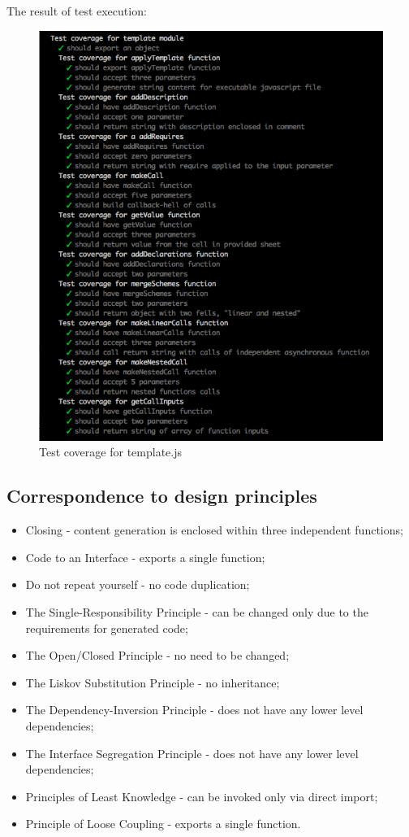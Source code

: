The result of test execution:
\begin{figure}[H]
	\centering
	\includegraphics[width=\linewidth]{grafiken/testTemplate.png}
	\caption{Test coverage for template.js}
	\label{fig:testTemplate}
\end{figure}

\subsection{Correspondence to design principles}
\begin{itemize}
	\item Closing - content generation is enclosed within three independent functions;
	\item Code to an Interface - exports a single function;
	\item Do not repeat yourself - no code duplication;
	\item The Single-Responsibility Principle - can be changed only due to the requirements for generated code;
	\item The Open/Closed Principle - no need to be changed;
	\item The Liskov Substitution Principle - no inheritance;
	\item The Dependency-Inversion Principle - does not have any lower level dependencies;
	\item The Interface Segregation Principle - does not have any lower level dependencies;
	\item Principles of Least Knowledge - can be invoked only via direct import;
	\item Principle of Loose Coupling - exports a single function.
\end{itemize}

